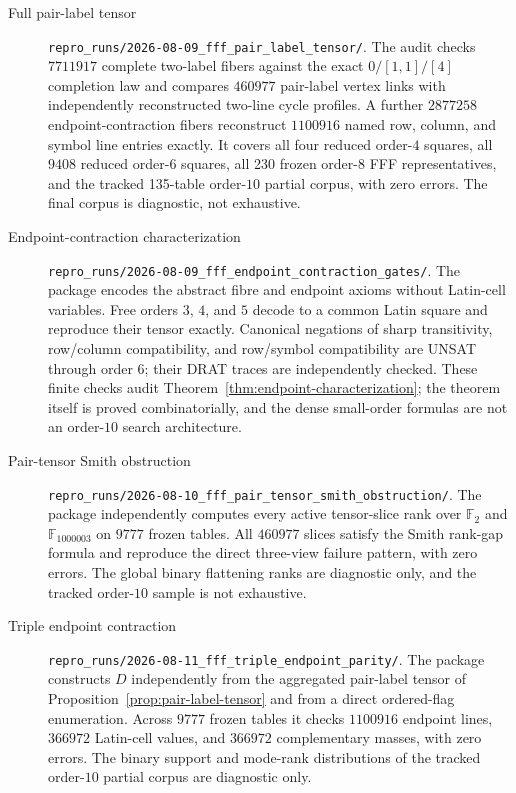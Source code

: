 \begin{description}
\item[Full pair-label tensor]
\nolinkurl{repro_runs/2026-08-09_fff_pair_label_tensor/}.
The audit checks $7711917$ complete two-label fibers against the exact
$0/[1,1]/[4]$ completion law and compares $460977$ pair-label vertex links
with independently reconstructed two-line cycle profiles.  A further
$2877258$ endpoint-contraction fibers reconstruct $1100916$ named row,
column, and symbol line entries exactly.  It covers all
four reduced order-$4$ squares, all $9408$ reduced order-$6$ squares, all
230 frozen order-$8$ FFF representatives, and the tracked 135-table
order-$10$ partial corpus, with zero errors.  The final corpus is diagnostic,
not exhaustive.

\item[Endpoint-contraction characterization]
\nolinkurl{repro_runs/2026-08-09_fff_endpoint_contraction_gates/}.
The package encodes the abstract fibre and endpoint axioms without Latin-cell
variables.  Free orders $3$, $4$, and $5$ decode to a common Latin square and
reproduce their tensor exactly.  Canonical negations of sharp transitivity,
row/column compatibility, and row/symbol compatibility are UNSAT through
order $6$; their DRAT traces are independently checked.  These finite checks
audit Theorem~\ref{thm:endpoint-characterization}; the theorem itself is
proved combinatorially, and the dense small-order formulas are not an
order-$10$ search architecture.

\item[Pair-tensor Smith obstruction]
\nolinkurl{repro_runs/2026-08-10_fff_pair_tensor_smith_obstruction/}.
The package independently computes every active tensor-slice rank over
$\mathbb F_2$ and $\mathbb F_{1000003}$ on $9777$ frozen tables.  All
$460977$ slices satisfy the Smith rank-gap formula and reproduce the direct
three-view failure pattern, with zero errors.  The global binary flattening
ranks are diagnostic only, and the tracked order-$10$ sample is not
exhaustive.

\item[Triple endpoint contraction]
\nolinkurl{repro_runs/2026-08-11_fff_triple_endpoint_parity/}.
The package constructs $D$ independently from the aggregated pair-label
tensor of Proposition~\ref{prop:pair-label-tensor} and
from a direct ordered-flag enumeration.  Across $9777$ frozen tables it
checks $1100916$ endpoint lines, $366972$ Latin-cell values, and $366972$
complementary masses, with zero errors.  The binary support and mode-rank
distributions of the tracked order-$10$ partial corpus are diagnostic only.


\end{description}

